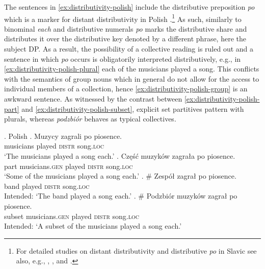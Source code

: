 The sentences in \ref{ex:distributivity-polish} include the distributive preposition \textit{po} which is a marker for distant distributivity in Polish \citep[e.g.,][]{przepiorkowski2008generalised,przepiorkowski2010towards,przepiorkowski2014distance,przepiorkowski-patejuk2013syntax}.\footnote{For detailed studies on distant distributivity and distributive \textit{po} in Slavic see also, e.g., \citet{franks1994parametric,franks1995parameters}, \citet{harves2003getting}, and \citet{knezevic2015numerals}.} As such, similarly to binominal \textit{each} \citep[e.g.,][]{safir_stowell1988binominal,zimmermann2002boys,dotlacil2012binominal,champollion2012each} and distributive numerals \citep[e.g.,][]{gil2002distributive,oh2005plurality,cable2014distributive,hofherr_etxeberria2017distributive} \textit{po} marks the distributive share and distributes it over the distributive key denoted by a different phrase, here the subject DP. As a result, the possibility of a collective reading is ruled out and a sentence in which \textit{po} occurs is obligatorily interpreted distributively, e.g., in \ref{ex:distributivity-polish-plural} each of the musicians played a song. This conflicts with the semantics of group nouns which in general do not allow for the access to individual members of a collection, hence \ref{ex:distributivity-polish-group} is an awkward sentence. As witnessed by the contrast between \ref{ex:distributivity-polish-part} and \ref{ex:distributivity-polish-subset}, explicit set partitives pattern with plurals, whereas \textit{podzbiór} behaves as typical collectives.

	\ex. Polish\label{ex:distributivity-polish}
    \ag. Muzycy zagrali po piosence.\label{ex:distributivity-polish-plural}\\
	musicians played \textsc{distr} song\textsc{.loc}\\
	`The musicians played a song each.'
	\bg. Część muzyków zagrała po piosence.\label{ex:distributivity-polish-part}\\
	part musicians\textsc{.gen} played \textsc{distr} song\textsc{.loc}\\
	`Some of the musicians played a song each.'
	\bg. \# Zespół zagrał po piosence.\label{ex:distributivity-polish-group}\\
	band played \textsc{distr} song\textsc{.loc}\\
	Intended: `The band played a song each.'
    \bg. \# Podzbiór muzyków zagrał po piosence.\label{ex:distributivity-polish-subset}\\
	subset musicians\textsc{.gen} played \textsc{distr} song\textsc{.loc}\\
	Intended: `A subset of the musicians played a song each.'
    
